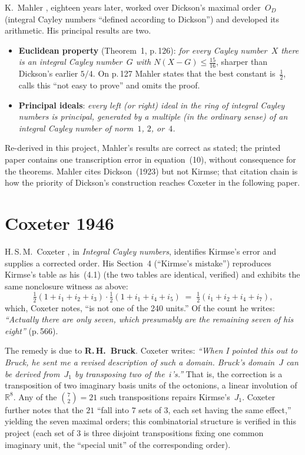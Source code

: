 \documentclass[11pt]{amsart}
\newcommand{\RR}{\mathbb{R}}
\newcommand{\Nrm}{N}
\begin{document}
K.~Mahler \cite{Mahler1942}, eighteen years later, worked over Dickson's maximal
order~$O_D$ (integral Cayley numbers ``defined according to Dickson'') and
developed its arithmetic.  His principal results are two.

\begin{itemize}
\item \textbf{Euclidean property} (Theorem~1, p.\,126):
\emph{for every Cayley number~$X$ there is an integral Cayley number~$G$
with $\Nrm(X - G) \le \tfrac{15}{16}$}, sharper than Dickson's earlier
$5/4$.  On p.\,127 Mahler states that the best constant is~$\tfrac12$,
calls this ``not easy to prove'' and omits the proof.
\item \textbf{Principal ideals}: \emph{every left (or right) ideal in the
ring of integral Cayley numbers is principal, generated by a multiple (in
the ordinary sense) of an integral Cayley number of norm~$1$, $2$, or~$4$.}
\end{itemize}

Re-derived in this project, Mahler's results are correct as stated; the
printed paper contains one transcription error in equation~(10), without
consequence for the theorems.  Mahler cites Dickson~(1923) but not Kirmse;
that citation chain is how the priority of Dickson's construction reaches
Coxeter in the following paper.

\section*{Coxeter 1946}

H.\,S.\,M.~Coxeter \cite{Coxeter1946}, in \emph{Integral Cayley numbers},
identifies Kirmse's error and supplies a corrected order.  His Section~4
(``Kirmse's mistake'') reproduces Kirmse's table as his~(4.1) (the two
tables are identical, verified) and exhibits the same nonclosure witness
as above:
\[
  \tfrac{1}{2}(1 + i_1 + i_2 + i_3) \cdot
  \tfrac{1}{2}(1 + i_1 + i_4 + i_5)
  \;=\; \tfrac{1}{2}(i_1 + i_2 + i_4 + i_7),
\]
which, Coxeter notes, ``is not one of the 240 units.''  Of the count he
writes: \emph{``Actually there are only seven, which presumably are the
remaining seven of his eight''} (p.\,566).

The remedy is due to \textbf{R.\,H.~Bruck}.  Coxeter writes:
\emph{``When I pointed this out to Bruck, he sent me a revised description
of such a domain.  Bruck's domain~$J$ can be derived from~$J_1$ by
transposing two of the~$i$'s.''}  That is, the correction is a transposition
of two imaginary basis units of the octonions, a linear involution
of~$\RR^8$.  Any of the $\binom{7}{2} = 21$ such transpositions repairs
Kirmse's~$J_1$.  Coxeter further notes that the $21$ ``fall into $7$ sets of
$3$, each set having the same effect,'' yielding the seven maximal orders;
this combinatorial structure is verified in this project (each set of $3$
is three disjoint transpositions fixing one common imaginary unit, the
``special unit'' of the corresponding order).
\end{document}
